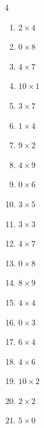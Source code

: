 \begin{multicols}{4}
\begin{enumerate}
\columnbreak %

  \item $2\times 4$
        \phantom{$=8$}

  \item $0\times 8$
        \phantom{$=0$}

  \item $4\times 7$
        \phantom{$=28$}

  \item $10\times 1$
        \phantom{$=10$}

  \item $3\times 7$
        \phantom{$=21$}

  \item $1\times 4$
        \phantom{$=4$}

  \item $9\times 2$
        \phantom{$=18$}

  \item $4\times 9$
        \phantom{$=36$}

  \item $0\times 6$
        \phantom{$=0$}

  \item $3\times 5$
        \phantom{$=15$}

  \item $3\times 3$
        \phantom{$=9$}

  \item $4\times 7$
        \phantom{$=28$}

  \item $0\times 8$
        \phantom{$=0$}

  \item $8\times 9$
        \phantom{$=72$}

  \item $4\times 4$
        \phantom{$=16$}

  \item $0\times 3$
        \phantom{$=0$}

  \item $6\times 4$
        \phantom{$=24$}

  \item $4\times 6$
        \phantom{$=24$}

  \item $10\times 2$
        \phantom{$=20$}

  \item $2\times 2$
        \phantom{$=4$}

  \item $5\times 0$
        \phantom{$=0$}


\end{enumerate}
\end{multicols}
